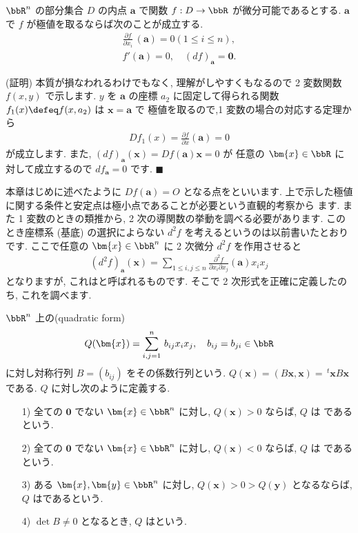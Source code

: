 \documentclass[openany, a4paper, oneside]{jsbook}
\begin{document}
\begin{thm}
$\bbR^n$ の部分集合 $D$ の内点 $\bm{a}$ で関数 $f:D\to\bbR$ が微分可能であるとする.
$\bm{a}$ で $f$ が極値を取るならば次のことが成立する.
\begin{align}
\frac{\partial f} {\partial x_i} \, (\bm{a})
=
0
(1 \leq i \leq n),\\
f'(\bm{a}) = 0,
\quad
(df) _{\bm{a}}=\bm{0}.
\end{align}
\end{thm}
(証明)
本質が損なわれるわけでもなく, 理解がしやすくもなるので 2 変数関数 $f (x,y)$ で示します.
$y$ を $\bm{a}$ の座標 $a_2$ に固定して得られる関数 $f_1 (x) \defeq f (x,a_2)$ は $\bm{x}=\bm{a}$ で
極値を取るので,1 変数の場合の対応する定理から
\begin{align}
D f_1 (x)
=
\frac{\partial f} {\partial x} ( \bm{a} )
=
0
\end{align}
が成立します. また,  $(df)_{ \bm{a} } ( \bm{x} ) = Df (\bm{a}) \bm{x} = 0$ が
任意の $\bm{x} \in \bbR$ に対して成立するので $df_{ \bm{a} } = 0$ です.  $\blacksquare$

本章はじめに述べたように $Df (\bm{a})=O$ となる点をといいます.
上で示した極値に関する条件と安定点は極小点であることが必要という直観的考察から
ます.
また 1 変数のときの類推から, 2 次の導関数の挙動を調べる必要があります.
このとき座標系 (基底) の選択によらない $d^2 f$ を考えるというのは以前書いたとおりです.
ここで任意の $\bm{x} \in \bbR^n$ に 2 次微分 $d^2f$ を作用させると
\begin{align}
(d^2 f)_{ \bm{a} } ( \bm{x} )
=
\sum_{1 \leq i ,j \leq n} \frac{ \partial^2 f} {\partial x_i \partial x_j} ( \bm{a} ) x_i  x_j
\end{align}
となりますが, これはと呼ばれるものです.
そこで 2 次形式を正確に定義したのち, これを調べます.

\begin{defn}
$\bbR^n$ 上の(quadratic form)
\begin{align}
Q ( \bm{x} )
=
\sum_{ i,j=1}^n \, b_{ij} x_i x_j , \quad b_{ij} = b_{j i} \in \bbR
\label{eq:8.11}
\end{align}
に対し対称行列 $B = ( b_{ ij } )$ をその係数行列という.
$Q ( \bm{x} ) = ( B\bm{x} , \bm{x} ) = \, ^t \bm{x} B \bm{x}$ である.
$Q$ に対し次のように定義する.
\begin{enumerate}
\item[1)] 全ての $\bm{0}$ でない $\bm{x} \in \bbR^n$ に対し,  $Q (\bm{x})>0$ ならば,  $Q$ は
であるという.
\item[2)] 全ての $\bm{0}$ でない $\bm{x} \in \bbR^n$ に対し,  $Q (\bm{x})<0$ ならば,  $Q$ は
であるという.
\item[3)] ある $\bm{x},\bm{y} \in \bbR^n$ に対し,  $Q (\bm{x}) > 0 > Q (\bm{y})$ となるならば,
$Q$ はであるという.
\item[4)] $\det B \not = 0$ となるとき,  $Q$ はという.
\end{enumerate}
\end{defn}
\end{document}
